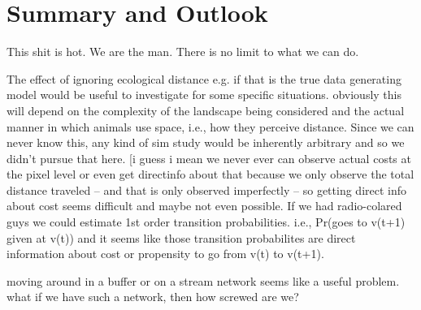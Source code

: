 \section{Summary and Outlook}

This shit is hot. We are the man. There is no limit to what we can do.


The effect of ignoring ecological distance e.g. if that is the true
data generating model would be useful to investigate for some specific
situations. obviously this will depend on the complexity of the
landscape being considered and the actual manner in which animals use
space, i.e., how they perceive distance. Since we can never know this,
any kind of sim study would be inherently arbitrary and so we didn't
pursue that here. [i guess i mean we never ever can observe actual
costs at the pixel level or even get directinfo about that because we
only observe the total distance traveled -- and that is only observed
imperfectly -- so getting direct info about cost seems difficult and
maybe not even possible. 
If we had radio-colared guys we could estimate 1st order transition
probabilities. i.e., Pr(goes to v(t+1) given at v(t)) and it seems
like those transition probabilites are direct information about cost
or propensity to go from v(t) to v(t+1).


moving around in a buffer or on a stream network seems like a useful
problem. what if we have such a network, then how screwed are we?


